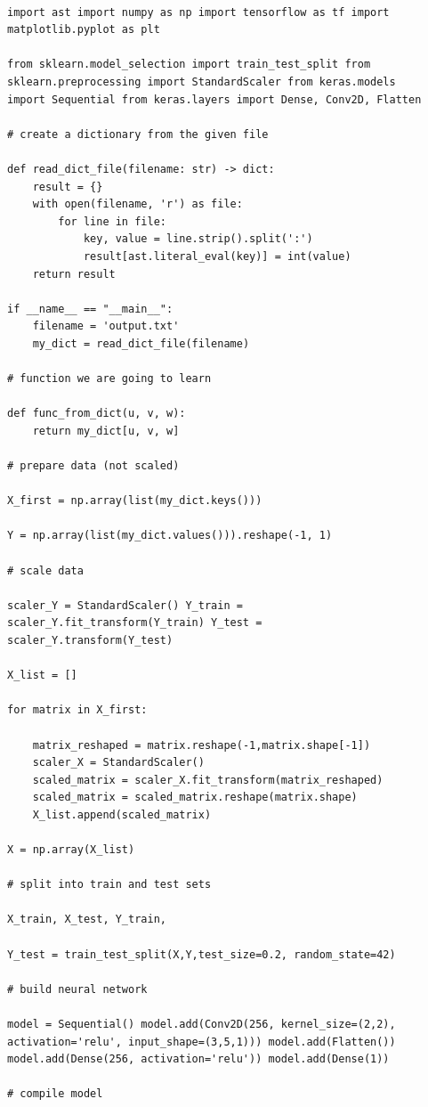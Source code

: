 \documentclass[14pt]{amsart}
\theoremstyle{definition}
\theoremstyle{remark}
\begin{document}
{\small
\begin{lstlisting}

import ast import numpy as np import tensorflow as tf import
matplotlib.pyplot as plt

from sklearn.model_selection import train_test_split from
sklearn.preprocessing import StandardScaler from keras.models
import Sequential from keras.layers import Dense, Conv2D, Flatten

# create a dictionary from the given file

def read_dict_file(filename: str) -> dict:
    result = {}
    with open(filename, 'r') as file:
        for line in file:
            key, value = line.strip().split(':')
            result[ast.literal_eval(key)] = int(value)
    return result

if __name__ == "__main__":
    filename = 'output.txt'
    my_dict = read_dict_file(filename)

# function we are going to learn

def func_from_dict(u, v, w):
    return my_dict[u, v, w]

# prepare data (not scaled)

X_first = np.array(list(my_dict.keys()))

Y = np.array(list(my_dict.values())).reshape(-1, 1)

# scale data

scaler_Y = StandardScaler() Y_train =
scaler_Y.fit_transform(Y_train) Y_test =
scaler_Y.transform(Y_test)

X_list = []

for matrix in X_first:

    matrix_reshaped = matrix.reshape(-1,matrix.shape[-1])
    scaler_X = StandardScaler()
    scaled_matrix = scaler_X.fit_transform(matrix_reshaped)
    scaled_matrix = scaled_matrix.reshape(matrix.shape)
    X_list.append(scaled_matrix)

X = np.array(X_list)

# split into train and test sets

X_train, X_test, Y_train,

Y_test = train_test_split(X,Y,test_size=0.2, random_state=42)

# build neural network

model = Sequential() model.add(Conv2D(256, kernel_size=(2,2),
activation='relu', input_shape=(3,5,1))) model.add(Flatten())
model.add(Dense(256, activation='relu')) model.add(Dense(1))

# compile model


\end{lstlisting}}
\end{document}
